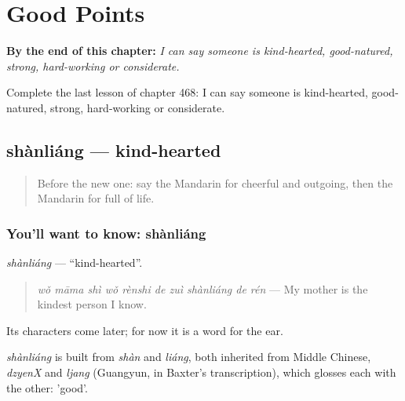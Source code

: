 
\chapter{Good Points}
\label{ch:zh-good-points}

\begin{chapteropening}
\textbf{By the end of this chapter:} \emph{I can say someone is kind-hearted, good-natured, strong, hard-working or considerate.}

Complete the last lesson of chapter 468: I can say someone is kind-hearted, good-natured, strong, hard-working or considerate.
\end{chapteropening}

\section[shànliáng]{shànliáng — kind-hearted}

\label{lesson:ZH-C468-shanliang}



\begin{quote}
Before the new one: say the Mandarin for cheerful and outgoing, then the Mandarin for full of life.
\end{quote}

\subsection*{You'll want to know: shànliáng}
\emph{shànliáng} — \textquotedblleft{}kind-hearted\textquotedblright{}.

\begin{quote}
\emph{wǒ māma shì wǒ rènshi de zuì shànliáng de rén} — My mother is the kindest person I know.
\end{quote}

Its characters come later; for now it is a word for the ear.

\begin{cousinweb}
\emph{shànliáng} is built from \emph{shàn} and \emph{liáng}, both inherited from Middle Chinese, \emph{dzyenX} and \emph{ljang} (Guangyun, in Baxter's transcription), which glosses each with the other: 'good'.
\end{cousinweb}

